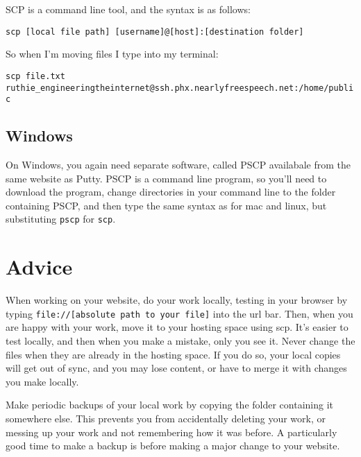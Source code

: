 \documentclass{article}
\begin{document}
SCP is a command line tool, and the syntax is as follows:

\begin{center}
\texttt{scp [local file path] [username]@[host]:[destination folder]}
\end{center}

So when I'm moving files I type into my terminal:
\begin{center}\texttt{scp file.txt ruthie\_engineeringtheinternet@ssh.phx.nearlyfreespeech.net:/home/public}\end{center}

\subsection{Windows}
On Windows, you again need separate software, called PSCP availabale from the same website as Putty.  PSCP is a command line program, so you'll need to download the program, change directories in your command line to the folder containing PSCP, and then type the same syntax as for mac and linux, but substituting \texttt{pscp} for \texttt{scp}.

\section{Advice}

When working on your website, do your work locally, testing in your browser by typing \texttt{file://[absolute path to your file]} into the url bar.  Then, when you are happy with your work, move it to your hosting space using scp.  It's easier to test locally, and then when you make a mistake, only you see it.  Never change the files when they are already in the hosting space.  If you do so, your local copies will get out of sync, and you may lose content, or have to merge it with changes you make locally.

Make periodic backups of your local work by copying the folder containing it somewhere else.  This prevents you from accidentally deleting your work, or messing up your work and not remembering how it was before.  A particularly good time to make a backup is before making a major change to your website.
\end{document}
